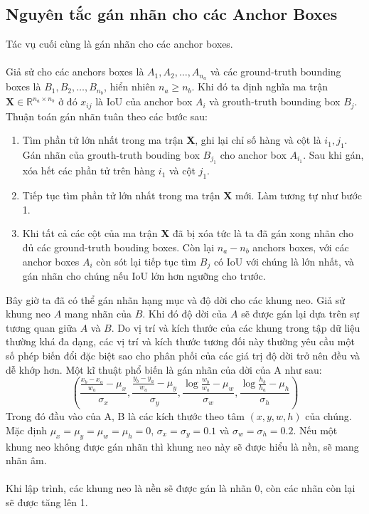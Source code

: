 \documentclass{article}
\begin{document}
\subsection{Nguyên tắc gán nhãn cho các Anchor Boxes}
Tác vụ cuối cùng là gán nhãn cho các anchor boxes.\\\\
Giả sử cho các anchors boxes là $A_1, A_2, \ldots, A_{n_a}$ và các ground-truth bounding boxes là $B_1, B_2, \ldots, B_{n_b}$, hiển nhiên $n_a \geq n_b$. Khi đó ta định nghĩa ma trận $\textbf{X} \in \mathbb{R}^{n_a \times n_b}$ ở đó $x_{ij}$ là IoU của anchor box $A_i$ và grouth-truth bounding box $B_j$. Thuận toán gán nhãn tuân theo các bước sau:
\begin{enumerate}
    \item Tìm phần tử lớn nhất trong ma trận \textbf{X}, ghi lại chỉ số hàng và cột là $i_1, j_1$. Gán nhãn của grouth-truth bouding box $B_{j_1}$ cho anchor box $A_{i_1}$. Sau khi gán, xóa hết các phần tử trên hàng $i_1$ và cột $j_1$.
    \item Tiếp tục tìm phần tử lớn nhất trong ma trận \textbf{X} mới. Làm tương tự như bước 1.
    \item Khi tất cả các cột của ma trận \textbf{X} đã bị xóa tức là ta đã gán xong nhãn cho đủ các ground-truth bouding boxes. Còn lại $n_a - n_b$ anchors boxes, với các anchor boxes $A_i$ còn sót lại tiếp tục tìm $B_j$ có IoU với chúng là lớn nhất, và gán nhãn cho chúng nếu IoU lớn hơn ngưỡng cho trước.
\end{enumerate}
Bây giờ ta đã có thể gán nhãn hạng mục và độ dời cho các khung neo. Giả sử khung neo $A$ mang nhãn của $B$. Khi đó độ dời của $A$ sẽ được gán lại dựa trên sự tương quan giữa $A$ và $B$. Do vị trí và kích thước của các khung trong tập dữ liệu thường khá đa dạng, các vị trí và kích thước tương đối này thường yêu cầu một số phép biến đổi đặc biệt sao cho phân phối của các giá trị độ dời trở nên đều và dễ khớp hơn. Một kĩ thuật phổ biến là gán nhãn của dời của A như sau:
\begin{equation}
    \left(\frac{\frac{x_b-x_a}{w_a} - \mu_x}{\sigma_x}, \frac{\frac{y_b-y_a}{w_a} - \mu_y}{\sigma_y}, \frac{\log{\frac{w_b}{w_a}} - \mu_w}{\sigma_w}, \frac{\log{\frac{h_b}{h_a}} - \mu_h}{\sigma_h} \right)
    \label{eq2}
\end{equation}
Trong đó đầu vào của A, B là các kích thước theo tâm $(x,y,w,h)$ của chúng. Mặc định $\mu_x = \mu_y = \mu_w = \mu_h = 0$, $\sigma_x = \sigma_y = 0.1$ và $\sigma_w = \sigma_h = 0.2$. Nếu một khung neo không được gán nhãn thì khung neo này sẽ được hiểu là nền, sẽ mang nhãn âm. \\\\
Khi lập trình, các khung neo là nền sẽ được gán là nhãn 0, còn các nhãn còn lại sẽ được tăng lên 1.
\end{document}
